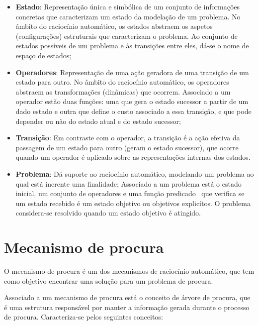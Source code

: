 \begin{itemize}
    \item \textbf{Estado}: Representação única e simbólica de um conjunto de informações concretas que caracterizam um estado da modelação de um problema. No âmbito do raciocínio automático, os estados abstraem os aspetos (configurações) estruturais que caracterizam o problema. Ao conjunto de estados possíveis de um problema e às transições entre eles, dá-se o nome de espaço de estados;
    \item \textbf{Operadores}: Representação de uma ação geradora de uma transição de um estado para outro.
    No âmbito do raciocínio automático, os operadores abstraem as transformações (dinâmicas) que ocorrem.
    Associado a um operador estão duas funções: uma que gera o estado sucessor a partir de um dado estado e outra que define o custo associado a essa transição, e que pode depender ou não do estado atual e do estado sucessor;
    \item \textbf{Transição}: Em contraste com o operador, a transição é a ação efetiva da passagem de um estado para outro (geram o estado sucessor), que ocorre quando um operador é aplicado sobre as representações internas dos estados.
    \item \textbf{Problema}: Dá suporte ao raciocínio automático, modelando um problema ao qual está inerente uma finalidade;
    Associado a um problema está o estado inicial, um conjunto de operadores e uma função predicado~\cite{stanford:fp:function-predicates} que verifica se um estado recebido é um estado objetivo ou objetivos explicítos.
    O problema considera-se resolvido quando um estado objetivo é atingido.
\end{itemize}


\section{Mecanismo de procura}\label{sec:mecanismo-procura}

O mecanismo de procura é um dos mecanismos de raciocínio automático, que tem como objetivo encontrar uma solução para um problema de procura.

Associado a um mecanismo de procura está o conceito de árvore de procura, que é uma estrutura responsável por manter a informação gerada durante o processo de procura.
Caracteriza-se pelos seguintes conceitos:

